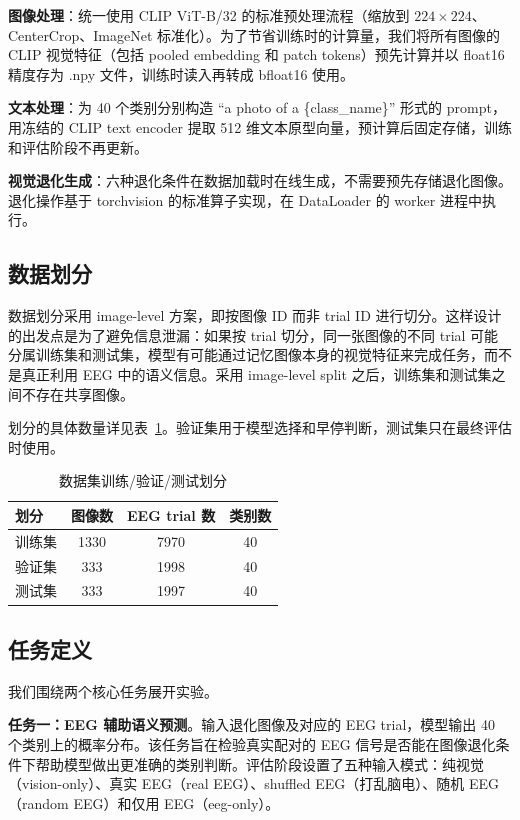 \textbf{图像处理}：统一使用 CLIP ViT-B/32 的标准预处理流程（缩放到 $224\times224$、CenterCrop、ImageNet 标准化）。为了节省训练时的计算量，我们将所有图像的 CLIP 视觉特征（包括 pooled embedding 和 patch tokens）预先计算并以 float16 精度存为 .npy 文件，训练时读入再转成 bfloat16 使用。

\textbf{文本处理}：为 40 个类别分别构造 ``a photo of a \{class\_name\}'' 形式的 prompt，用冻结的 CLIP text encoder 提取 512 维文本原型向量，预计算后固定存储，训练和评估阶段不再更新。

\textbf{视觉退化生成}：六种退化条件在数据加载时在线生成，不需要预先存储退化图像。退化操作基于 torchvision 的标准算子实现，在 DataLoader 的 worker 进程中执行。

\subsection{数据划分}

数据划分采用 image-level 方案，即按图像 ID 而非 trial ID 进行切分。这样设计的出发点是为了避免信息泄漏：如果按 trial 切分，同一张图像的不同 trial 可能分属训练集和测试集，模型有可能通过记忆图像本身的视觉特征来完成任务，而不是真正利用 EEG 中的语义信息。采用 image-level split 之后，训练集和测试集之间不存在共享图像。

划分的具体数量详见表~\ref{tab:split}。验证集用于模型选择和早停判断，测试集只在最终评估时使用。

\begin{table}[htbp]
  \centering
  \caption{数据集训练/验证/测试划分}
  \label{tab:split}
  \begin{tabular}{l c c c}
    \toprule
    划分 & 图像数 & EEG trial 数 & 类别数 \\
    \midrule
    训练集 & 1330 & 7970 & 40 \\
    验证集 & 333 & 1998 & 40 \\
    测试集 & 333 & 1997 & 40 \\
    \bottomrule
  \end{tabular}
\end{table}

\subsection{任务定义}

我们围绕两个核心任务展开实验。

\textbf{任务一：EEG 辅助语义预测}。输入退化图像及对应的 EEG trial，模型输出 40 个类别上的概率分布。该任务旨在检验真实配对的 EEG 信号是否能在图像退化条件下帮助模型做出更准确的类别判断。评估阶段设置了五种输入模式：纯视觉（vision-only）、真实 EEG（real EEG）、shuffled EEG（打乱脑电）、随机 EEG（random EEG）和仅用 EEG（eeg-only）。

